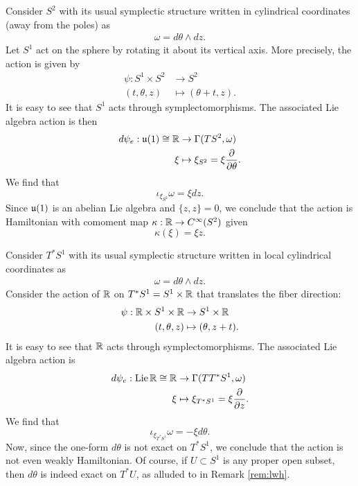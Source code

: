 \documentclass{amsart}
\begin{document}
\begin{example}
    Consider $S^2$ with its usual symplectic structure written in cylindrical coordinates
    (away from the poles) as
    \begin{align*}
        \omega = d\theta\wedge dz.
    \end{align*}
    Let $S^1$ act on the sphere by rotating it about its vertical axis. More precisely,
    the action is given by
    \begin{align*}
        \psi: S^1\times S^2 &\to S^2\\
        (t, \theta, z) &\mapsto (\theta + t, z).
    \end{align*}
    It is easy to see that $S^1$ acts through symplectomorphisms.
    The associated Lie algebra action is then
    \begin{align*}
        d\psi_e:\mathfrak u(1)\cong\mathbb{R}&\to \Gamma(TS^2,\omega)\\
        \xi&\mapsto \xi_{S^2}=\xi\frac{\partial}{\partial\theta}.
    \end{align*}
    We find that
    \begin{equation*}
        \iota_{\xi_{S^2}} \omega = \xi dz.
    \end{equation*}
    Since $\mathfrak u(1)$ is an abelian Lie algebra and $\{z,z\}=0$, we conclude that the action
    is Hamiltonian with comoment map $\kappa:\mathbb{R}\to C^\infty(S^2)$ given
    \begin{equation*}
        \kappa(\xi)=\xi z.
    \end{equation*}
\end{example}

\begin{example}
    Consider $T^*S^1$ with its usual symplectic structure written in local cylindrical coordinates as
    \begin{align*}
        \omega = d\theta\wedge dz.
    \end{align*}
    Consider the action of $\mathbb{R}$ on $T^*S^1=S^1\times\mathbb{R}$ that translates the fiber direction:
    \begin{align*}
        \psi: \mathbb{R}\times S^1\times\mathbb{R} &\to S^1\times\mathbb{R}\\
        (t,\theta,z) &\mapsto (\theta, z+t).
    \end{align*}
    It is easy to see that $\mathbb{R}$ acts through symplectomorphisms.
    The associated Lie algebra action is
    \begin{align*}
        d\psi_e:\operatorname{Lie}\mathbb{R}\cong\mathbb{R} &\to \Gamma(TT^*S^1,\omega)\\
        \xi &\mapsto \xi_{T^*S^1}=\xi\frac{\partial}{\partial z}.
    \end{align*}
    We find that
    \begin{equation*}
        \iota_{\xi_{T^*S^1}}\omega = -\xi d\theta.
    \end{equation*}
    Now, since the one-form $d\theta$ is not exact on $T^*S^1$, we conclude that the action
    is not even weakly Hamiltonian. Of course, if $U\subset S^1$ is any proper open subset,
    then $d\theta$ is indeed exact on $T^*U$, as alluded to in Remark \ref{rem:lwh}.
    \label{ex:notwh}
\end{example}
\end{document}
